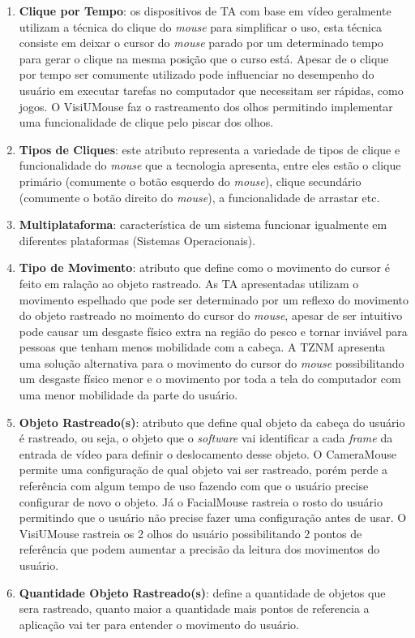 \begin{enumerate}
\item \textbf{Clique por Tempo}: os dispositivos de TA com base em vídeo geralmente utilizam a técnica do clique do \textit{mouse} para simplificar o uso, esta técnica consiste em deixar o cursor do \textit{mouse} parado por um determinado tempo para gerar o clique na mesma posição que o curso está. Apesar de o clique por tempo ser comumente utilizado pode influenciar no desempenho do usuário em executar tarefas no computador que necessitam ser rápidas, como jogos. O VisiUMouse faz o rastreamento dos olhos permitindo implementar uma funcionalidade de clique pelo piscar dos olhos. 

\item \textbf{Tipos de Cliques}: este atributo representa a variedade de tipos de clique e funcionalidade do \textit{mouse} que a tecnologia apresenta, entre eles estão o clique primário (comumente o botão esquerdo do \textit{mouse}), clique secundário (comumente o botão direito do \textit{mouse}), a funcionalidade de arrastar etc.

\item \textbf{Multiplataforma}: característica de um sistema funcionar igualmente em diferentes plataformas (Sistemas Operacionais).

\item \textbf{Tipo de Movimento}: atributo que define como o movimento do cursor é feito em ralação ao objeto rastreado. As TA apresentadas utilizam o movimento espelhado que pode ser determinado por um reflexo do movimento do objeto rastreado no moimento do cursor do \textit{mouse}, apesar de ser intuitivo pode causar um desgaste físico extra na região do pesco e tornar inviável para pessoas que tenham menos mobilidade com a cabeça. A TZNM apresenta uma solução alternativa para o movimento do cursor do \textit{mouse} possibilitando um desgaste físico menor e o movimento por toda a tela do computador com uma menor mobilidade da parte do usuário.

\item \textbf{Objeto Rastreado(s)}: atributo que define qual objeto da cabeça do usuário é rastreado, ou seja, o objeto que o \textit{software} vai identificar a cada \textit{frame} da entrada de vídeo para definir o deslocamento desse objeto. O CameraMouse permite uma configuração de qual objeto vai ser rastreado, porém perde a referência com algum tempo de uso fazendo com que o usuário precise configurar de novo o objeto. Já o FacialMouse rastreia o rosto do usuário permitindo que o usuário não precise fazer uma configuração antes de usar. O VisiUMouse rastreia os 2 olhos do usuário possibilitando 2 pontos de referência que podem aumentar a precisão da leitura dos movimentos do usuário.

\item \textbf{Quantidade Objeto Rastreado(s)}: define a quantidade de objetos que sera rastreado, quanto maior a quantidade mais pontos de referencia a aplicação vai ter para entender o movimento do usuário.
\end{enumerate}

